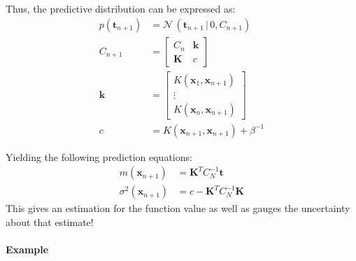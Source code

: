 \documentclass[a4paper, 11pt, accentcolor = tud3b]{tudreport}
\newcommand{\given}{\ensuremath{\,\vert\,}}
\renewcommand{\vec}[1]{\mathbf{#1}}
\begin{document}
				Thus, the predictive distribution can be expressed as:
				\begin{align}
					p(\vec{t}_{n + 1}) &= \mathcal{N}\,(\vec{t}_{n + 1} \given 0, C_{n + 1}) \\
					C_{n + 1} &=
						\begin{bmatrix}
							C_n & \vec{k} \\
							\vec{K} & c
						\end{bmatrix} \\
					\vec{k} &=
						\begin{bmatrix}
							K(\vec{x}_1, \vec{x}_{n + 1}) \\
							\vdots \\
							K(\vec{x}_n, \vec{x}_{n + 1})
						\end{bmatrix} \\
					c &= K(\vec{x}_{n + 1}, \vec{x}_{n + 1}) + \beta^{-1}
				\end{align}
				
				Yielding the following prediction equations:
				\begin{align}
					m(\vec{x}_{n + 1}) &= \vec{K}^T C_N^{-1} \vec{t} \\
					\sigma^2(\vec{x}_{n + 1}) &= c - \vec{K}^T C_N^{-1} \vec{K}
				\end{align}
				This gives an estimation for the function value as well as gauges the uncertainty about that estimate!
				
				\paragraph{Example}
\end{document}

